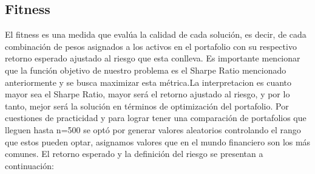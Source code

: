 \documentclass[9pt,a4paper,twoside]{rho-class/rho}
\begin{document}
        \subsection{Fitness}
            El  fitness es una medida que evalúa la calidad de cada solución, es decir, de cada combinación de pesos asignados a los activos en el portafolio con su respectivo retorno esperado ajustado al riesgo que esta conlleva. Es importante mencionar que la función objetivo de nuestro problema es el Sharpe Ratio mencionado anteriormente y se busca maximizar esta métrica.La interpretacion es cuanto mayor sea el Sharpe Ratio, mayor será el retorno ajustado al riesgo, y por lo tanto, mejor será la solución en términos de optimización del portafolio.
            Por cuestiones de practicidad y para lograr tener una comparación de portafolios que lleguen hasta n=500 se optó por generar valores aleatorios controlando el rango que estos pueden optar, asignamos valores que en el mundo financiero son los más comunes. 
            El retorno esperado y la definición del riesgo se presentan a continuación:\\
            
\end{document}
